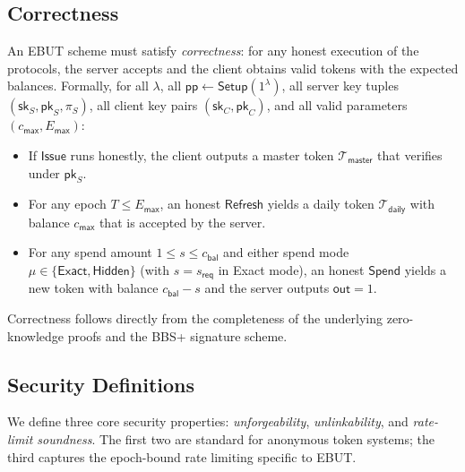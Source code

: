 \documentclass[11pt]{article}
\theoremstyle{definitionstyle}
\theoremstyle{plain}
\begin{document}
\subsection{Correctness}
An EBUT scheme must satisfy \emph{correctness}: for any honest execution of the protocols, the server accepts and the client obtains valid tokens with the expected balances. Formally, for all $\lambda$, all $\mathsf{pp} \leftarrow \mathsf{Setup}(1^\lambda)$, all server key tuples $(\mathsf{sk}_S, \mathsf{pk}_S, \pi_S)$, all client key pairs $(\mathsf{sk}_C, \mathsf{pk}_C)$, and all valid parameters $(c_{\mathsf{max}}, E_{\mathsf{max}})$:
\begin{itemize}
\item If $\mathsf{Issue}$ runs honestly, the client outputs a master token $\mathcal{T}_{\mathsf{master}}$ that verifies under $\mathsf{pk}_S$.
\item For any epoch $T \le E_{\mathsf{max}}$, an honest $\mathsf{Refresh}$ yields a daily token $\mathcal{T}_{\mathsf{daily}}$ with balance $c_{\mathsf{max}}$ that is accepted by the server.
\item For any spend amount $1 \le s \le c_{\mathsf{bal}}$ and either spend mode $\mu \in \{\mathsf{Exact},\mathsf{Hidden}\}$ (with $s = s_{\mathsf{req}}$ in Exact mode), an honest $\mathsf{Spend}$ yields a new token with balance $c_{\mathsf{bal}}-s$ and the server outputs $\mathsf{out}=1$.
\end{itemize}
Correctness follows directly from the completeness of the underlying zero-knowledge proofs and the BBS+ signature scheme.

\subsection{Security Definitions}
We define three core security properties: \emph{unforgeability}, \emph{unlinkability}, and \emph{rate-limit soundness}. The first two are standard for anonymous token systems; the third captures the epoch-bound rate limiting specific to EBUT.
\end{document}
